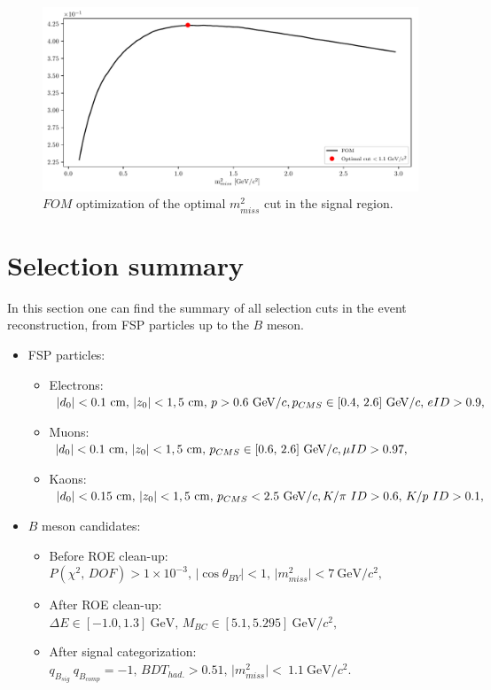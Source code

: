 \documentclass[headings=standardclasses,headings=big,oneside,a4paper,openany,12pt]{scrbook}
\newcommand {\e}[1]{\mathrm{~#1}}
\newcommand {\E}[1]{\times 10^{#1}}
\begin{document}
\begin{figure}[H]
\centering
\captionsetup{width=0.8\linewidth}
\includegraphics[width=\linewidth]{fig/missm2_opt}
\caption{$FOM$ optimization of the optimal $m_{miss}^2$ cut in the signal region.}
\label{fig:missm2opt}
\end{figure}

\section{Selection summary}
\label{s:ss}
In this section one can find the summary of all selection cuts in the event reconstruction, from FSP particles up to the $B$ meson.

\begin{itemize}
\item FSP particles:
	\begin{itemize}
	\item Electrons: $\vert d_0 \vert < 0.1\e{cm},\,\vert z_0 \vert < 1,5\e{cm},\,p>0.6\e{GeV}/c,\\p_{CMS}\in[0.4,\,2.6]\e{GeV}/c,\,eID>0.9,$
    \item Muons: $\vert d_0 \vert < 0.1\e{cm},\,\vert z_0 \vert < 1,5\e{cm},\,p_{CMS}\in[0.6,\,2.6]\e{GeV}/c,\\\mu ID>0.97,$
    \item Kaons: $\vert d_0 \vert < 0.15\e{cm},\,\vert z_0 \vert < 1,5\e{cm},\,p_{CMS} < 2.5\e{GeV}/c,\\K/\pi~ID>0.6,\,K/p~ID>0.1,$
	\end{itemize}
\item $B$ meson candidates:
	\begin{itemize}
	\item Before ROE clean-up: $P(\chi^2,\,DOF) > 1\E{-3},\,\vert \cos \theta_{BY} \vert < 1,\,\vert m_{miss}^2 \vert < 7\e{GeV}/c^2,$
    \item After ROE clean-up: $\Delta E \in [-1.0,1.3]\e{GeV},\,M_{BC} \in [5.1,5.295]\e{GeV}/c^2,$
    \item After signal categorization: $q_{B_{sig}}~q_{B_{comp}} = -1,\,BDT_{had.} > 0.51,\,\vert m_{miss}^2\vert<~1.1\e{GeV}/c^2.$
	\end{itemize}
\end{itemize}
\end{document}
